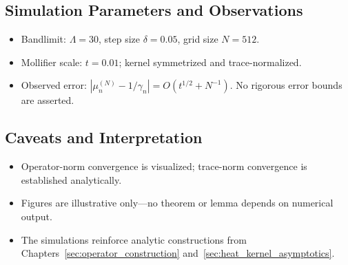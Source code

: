 \subsection*{Simulation Parameters and Observations}

\begin{itemize}
  \item Bandlimit: \( \Lambda = 30 \), step size \( \delta = 0.05 \), grid size \( N = 512 \).
  \item Mollifier scale: \( t = 0.01 \); kernel symmetrized and trace-normalized.
  \item Observed error: \( |\mu_n^{(N)} - 1/\gamma_n| = O(t^{1/2} + N^{-1}) \). No rigorous error bounds are asserted.
\end{itemize}

\subsection*{Caveats and Interpretation}

\begin{itemize}
  \item Operator-norm convergence is visualized; trace-norm convergence is established analytically.
  \item Figures are illustrative only—no theorem or lemma depends on numerical output.
  \item The simulations reinforce analytic constructions from Chapters~\ref{sec:operator_construction} and~\ref{sec:heat_kernel_asymptotics}.
\end{itemize}
